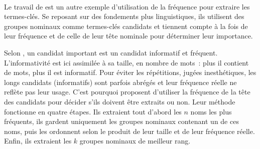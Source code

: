        ~\\Le travail de  est un autre exemple
        d'utilisation de la fréquence pour extraire les termes-clés. Se reposant
        sur des fondements plus linguistiques, ils utilisent des groupes
        nominaux comme termes-clés candidats et tiennent compte à la fois de
        leur fréquence et de celle de leur tête nominale pour déterminer leur
        importance.
        
        Selon , un candidat important est un
        candidat informatif et fréquent. L'informativité est ici assimilée à sa
        taille, en nombre de mots~: plus il contient de mots, plus il est
        informatif. Pour éviter les répétitions, jugées inesthétiques, les longs
        candidats (informatifs) sont parfois abrégés et leur fréquence réelle ne
        reflète pas leur usage. C'est pourquoi
         proposent d'utiliser la fréquence de
        la tête des candidats pour décider s'ils doivent être extraits ou non.
        Leur méthode fonctionne en quatre étapes. Ils extraient tout d'abord les
        $n$ noms les plus fréquents, ils gardent uniquement les groupes nominaux
        contenant un de ces noms, puis les ordonnent selon le produit de leur
        taille et de leur fréquence réelle. Enfin, ils extraient les $k$ groupes
        nominaux de meilleur rang.

